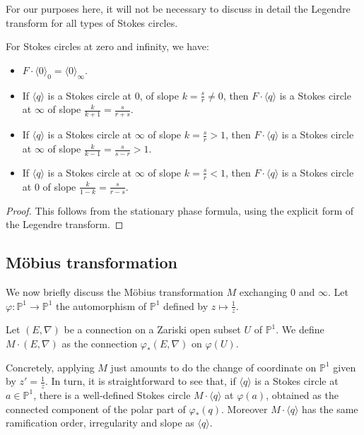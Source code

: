 \documentclass[11pt,a4paper]{amsart}
\numberwithin{equation}{section}
\newcommand{\cir}[1]{\langle #1 \rangle}
\begin{document}
For our purposes here, it will not be necessary to discuss in detail the Legendre transform for all types of Stokes circles.

\begin{lemma}For Stokes circles at zero and infinity, we have:
\begin{itemize}
\item $F\cdot \cir{0}_0=\cir{0}_\infty$.
\item If $\cir{q}$ is a Stokes circle at 0, of slope $k=\frac{s}{r}\neq 0$, then $F\cdot \cir{q}$ is a Stokes circle at $\infty$ of slope $\frac{k}{k+1}=\frac{s}{r+s}$.
\item If $\cir{q}$ is a Stokes circle at $\infty$ of slope $k=\frac{s}{r}>1$, then $F\cdot \cir{q}$ is a Stokes circle at $\infty$ of slope $\frac{k}{k-1}=\frac{s}{s-r}>1$.
\item If $\cir{q}$ is a Stokes circle at $\infty$ of slope $k=\frac{s}{r}<1$, then $F\cdot \cir{q}$ is a Stokes circle at $0$ of slope $\frac{k}{1-k}=\frac{s}{r-s}$.
\end{itemize}
\end{lemma}

\begin{proof}
This follows from the stationary phase formula, using the explicit form of the Legendre transform.
\end{proof}

\subsection{Möbius transformation}

We now briefly discuss the Möbius transformation $M$ exchanging $0$ and $\infty$. Let $\varphi:\mathbb P^1\to \mathbb P^1$ the automorphism of $\mathbb P^1$ defined by $z\mapsto\frac{1}{z}$.  

\begin{definition}
Let $(E,\nabla)$ be a connection on a Zariski open subset $U$ of $\mathbb P^1$. We define $M\cdot (E,\nabla)$ as the connection $\varphi_*(E,\nabla)$ on $\varphi(U)$.
\end{definition}

Concretely, applying $M$ just amounts to do the change of coordinate on $\mathbb P^1$ given by $z'=\frac{1}{z}$. In turn, it is straightforward to see that, if $\cir{q}$ is a Stokes circle at $a\in \mathbb P^1$, there is a well-defined Stokes circle $M\cdot \cir{q}$ at $\varphi(a)$, obtained as the connected component of the polar part of $\varphi_*(q)$. Moreover $M\cdot \cir{q}$ has the same ramification order, irregularity and slope as $\cir{q}$.
\end{document}
